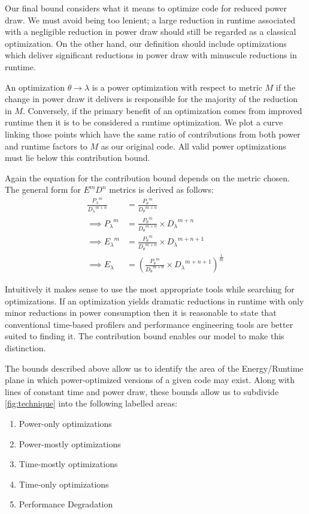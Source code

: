 Our final bound considers what it means to optimize code for reduced power draw. We must avoid being too lenient; a large reduction in runtime associated with a negligible reduction in power draw should still be regarded as a classical optimization. On the other hand, our definition should include optimizations which deliver significant reductions in power draw with minuscule reductions in runtime. 

An optimization $\theta \to \lambda$ is a power optimization with respect to metric $M$ if the change in power draw it delivers is responsible for the majority of the reduction in $M$. Conversely, if the primary benefit of an optimization comes from improved runtime then it is to be considered a runtime optimization. We plot a curve linking those points which have the same ratio of contributions from both power and runtime factors to $M$ as our original code. All valid power optimizations must lie below this contribution bound. 

Again the equation for the contribution bound depends on the metric chosen.
The general form for $E^mD^n$ metrics is derived as follows:
\begin{align}
\frac{{P_{\lambda}}^m}{{D_{\lambda}}^{m+n}} &= \frac{{P_{\theta}}^m}{{D_{\theta}}^{m+n}} \nonumber \\
\implies {P_{\lambda}}^m &= \frac{{P_{\theta}}^m}{{D_{\theta}}^{m+n}} \times {D_\lambda}^{m+n} \nonumber \\ 
\implies {E_{\lambda}}^m &= \frac{{P_{\theta}}^m}{{D_{\theta}}^{m+n}} \times {D_\lambda}^{m+n+1} \nonumber \\ 
\implies E_{\lambda} &= (\frac{{P_{\theta}}^m}{{D_{\theta}}^{m+n}} \times {D_\lambda}^{m+n+1})^{\frac{1}{m}} 
\end{align}

Intuitively it makes sense to use the most appropriate tools while searching for optimizations.  If an optimization yields dramatic reductions in runtime with only minor reductions in power consumption then it is reasonable to state that conventional time-based profilers and performance engineering tools are better suited to finding it. The contribution bound enables our model to make this distinction.

The bounds described above allow us to identify the area of the Energy/Runtime plane in which power-optimized versions of a given code may exist. 
Along with lines of constant time and power draw, these bounds allow us to subdivide \autoref{fig:technique} into the following labelled areas:
\begin{enumerate}
\item Power-only optimizations
\item Power-mostly optimizations
\item Time-mostly optimizations
\item Time-only optimizations
\item Performance Degradation
\end{enumerate}

